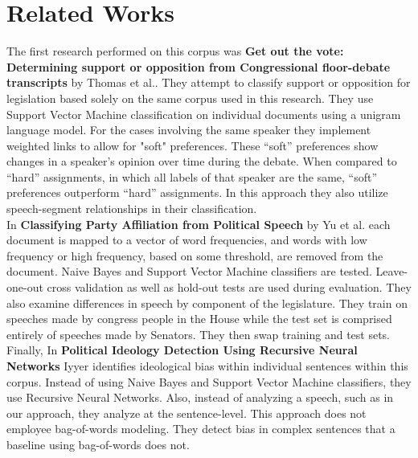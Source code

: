 \documentclass[a4paper, 12pt]{article}
\begin{document}
\section{Related Works}
\label{gen_inst}
The first research performed on this corpus was \cite{thomas2006get} \textbf{Get out the vote: Determining support or opposition from Congressional floor-debate transcripts} by Thomas et al.. They attempt to classify support or opposition for legislation based solely on the same corpus used in this research. They use Support Vector Machine classification on individual documents using a unigram language model. For the cases involving the same speaker they implement weighted links to allow for "soft" preferences. These ``soft'' preferences show changes in a speaker's opinion over time during the debate. When compared to ``hard'' assignments, in which all labels of that speaker are the same,  ``soft'' preferences outperform ``hard'' assignments. In this approach they also utilize speech-segment relationships in their classification. \\

\noindent	
In \cite{yu2008classifying} \textbf{Classifying Party Affiliation from Political Speech} by Yu et al. each document is mapped to a vector of word frequencies, and words with low frequency or high frequency, based on some threshold, are removed from the document. Naive Bayes and Support Vector Machine classifiers are tested. Leave-one-out cross validation as well as hold-out tests are used during evaluation. They also examine differences in speech by component of the legislature. They train on speeches made by congress people in the House while the test set is comprised entirely of speeches made by Senators.  They then swap training and test sets. 
\noindent
Finally, In  \cite{iyyer2014political} \textbf{Political Ideology Detection Using Recursive Neural Networks} Iyyer identifies ideological bias within individual sentences within this corpus. Instead of using Naive Bayes and Support Vector Machine classifiers, they use Recursive Neural Networks. Also, instead of analyzing a speech, such as in our approach, they analyze at the sentence-level. This approach does not employee bag-of-words modeling. They detect bias in complex sentences that a baseline using bag-of-words does not. 
	

	
\end{document}
